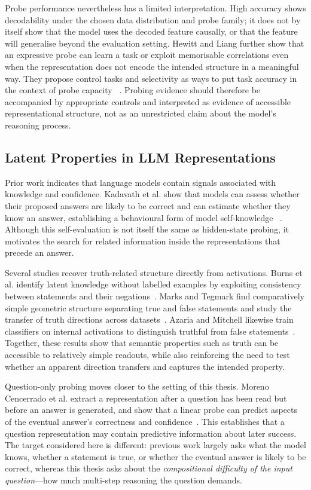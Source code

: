 Probe performance nevertheless has a limited interpretation. High accuracy
shows decodability under the chosen data distribution and probe family; it does
not by itself show that the model uses the decoded feature causally, or that the
feature will generalise beyond the evaluation setting. Hewitt and Liang further
show that an expressive probe can learn a task or exploit memorisable
correlations even when the representation does not encode the intended
structure in a meaningful way. They propose control tasks and selectivity as
ways to put task accuracy in the context of probe capacity
~\cite{hewitt2019control}. Probing evidence should therefore be accompanied by
appropriate controls and interpreted as evidence of accessible representational
structure, not as an unrestricted claim about the model's reasoning process.

\subsection{Latent Properties in LLM Representations}
\label{subsec:latent-properties}

Prior work indicates that language models contain signals associated with
knowledge and confidence. Kadavath et al. show that models can assess whether
their proposed answers are likely to be correct and can estimate whether they
know an answer, establishing a behavioural form of model self-knowledge
~\cite{kadavath2022know}. Although this self-evaluation is not itself the same
as hidden-state probing, it motivates the search for related information inside
the representations that precede an answer.

Several studies recover truth-related structure directly from activations.
Burns et al. identify latent knowledge without labelled examples by exploiting
consistency between statements and their negations~\cite{burns2023discovering}.
Marks and Tegmark find comparatively simple geometric structure separating true
and false statements and study the transfer of truth directions across
datasets~\cite{marks2024geometry}. Azaria and Mitchell likewise train
classifiers on internal activations to distinguish truthful from false
statements~\cite{azaria2023internal}. Together, these results show that semantic
properties such as truth can be accessible to relatively simple readouts, while
also reinforcing the need to test whether an apparent direction transfers and
captures the intended property.

Question-only probing moves closer to the setting of this thesis. Moreno
Cencerrado et al. extract a representation after a question has been read but
before an answer is generated, and show that a linear probe can predict aspects
of the eventual answer's correctness and confidence~\cite{moreno2025noanswer}.
This establishes that a question representation may contain predictive
information about later success. The target considered here is different:
previous work largely asks what the model knows, whether a statement is true, or
whether the eventual answer is likely to be correct, whereas this thesis asks
about the \emph{compositional difficulty of the input question}---how much
multi-step reasoning the question demands.

